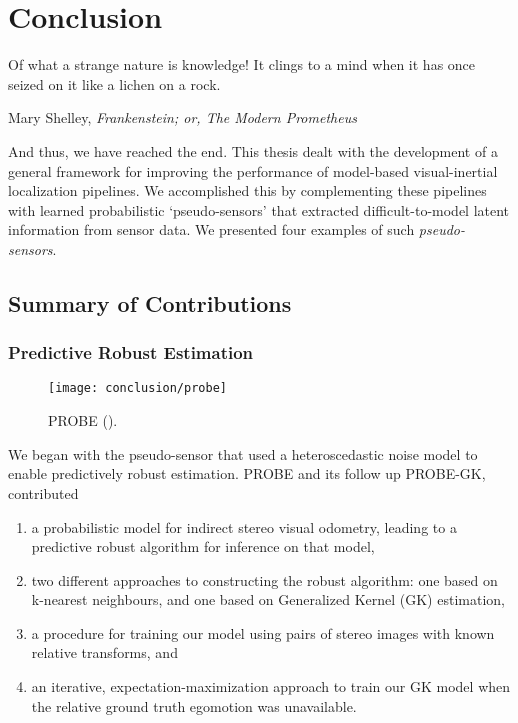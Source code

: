 \chapter{Conclusion}
\epigraph{Of what a strange nature is knowledge! It clings to a mind when it has once seized on it like a lichen on a rock.}{Mary Shelley, \textit{Frankenstein; or, The Modern Prometheus}}


And thus, we have reached the end. This thesis dealt with the development of a general framework for improving the performance of model-based visual-inertial localization pipelines. We accomplished this by complementing these pipelines with learned probabilistic ‘pseudo-sensors’ that extracted difficult-to-model latent information from sensor data.  We presented four examples of such \textit{pseudo-sensors}. 

\section{Summary of Contributions}

\subsection{Predictive Robust Estimation}

\begin{wrapfigure}{r}{0.3\textwidth}
  \begin{center}
  	\vspace{-25pt}
    \texttt{[image: conclusion/probe]}
     \vspace{-25pt}
  \end{center}
  \caption{PROBE ().}
  \vspace{-5pt}
\end{wrapfigure}


We began with the pseudo-sensor that used a heteroscedastic noise model to enable predictively robust estimation. PROBE and its follow up PROBE-GK, contributed
\begin{enumerate}
\item a probabilistic model for indirect stereo visual odometry, leading to a predictive robust algorithm for inference on that model,
\item two different approaches to constructing the robust algorithm: one based on k-nearest neighbours, and one based on Generalized Kernel (GK) estimation,
\item a procedure for training our model using pairs of stereo images with known relative transforms, and
\item an iterative, expectation-maximization approach to train our GK model when the relative ground truth egomotion was unavailable.
\end{enumerate}


